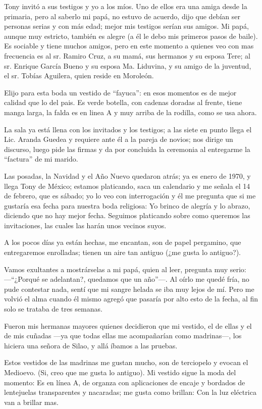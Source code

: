 \documentclass[letterpaper, 12pt]{book}
\begin{document}
Tony invitó a sus testigos y yo a los míos. Uno de ellos era una amiga desde la primaria, pero al saberlo mi papá, no estuvo de acuerdo, dijo que debían ser personas serias y con más edad; mejor mis testigos serían sus amigos. Mi papá, aunque muy estricto, también es alegre (a él le debo mis primeros pasos de baile). Es sociable y tiene muchos amigos, pero en este momento a quienes veo con mas frecuencia es al sr. Ramiro Cruz, a su mamá, sus hermanos y su esposa Tere; al sr. Enrique García Bueno y su esposa Ma. Liduvina, y su amigo de la juventud, el sr. Tobías Aguilera, quien reside en Moroleón.

Elijo para esta boda un vestido de ``fayuca'': en esos momentos es de mejor calidad que lo del pais. Es verde botella, con cadenas doradas al frente, tiene manga larga, la falda es en linea A y muy arriba de la rodilla, como se usa ahora.

La sala ya está llena con los invitados y los testigos; a las siete en punto llega el Lic. Aranda Guedea y requiere ante él a la pareja de novios; nos dirige un discurso, luego pide las firmas y da por concluida la ceremonia al entregarme la ``factura'' de mi marido.

Las posadas, la Navidad y el Año Nuevo quedaron atrás; ya es enero de 1970, y llega Tony de México; estamos platicando, saca un calendario y me señala el 14 de febrero, que es sábado; yo lo veo con interrogación y él me pregunta que si me gustaría esa fecha para nuestra boda religiosa: Yo brinco de alegría y lo abrazo, diciendo que no hay mejor fecha. Seguimos platicando sobre como queremos las invitaciones, las cuales las harán unos vecinos suyos.

A los pocos días ya están hechas, me encantan, son de papel pergamino, que entregaremos enrolladas; tienen un aire tan antiguo (¿me gusta lo antiguo?).

Vamos exultantes a mostrárselas a mi papá, quien al leer, pregunta muy serio: ---``¿Porqué se adelantan?, quedamos que un año''---. Al oírlo me quedé fría, no pude contestar nada, sentí que mi sangre helada se iba muy lejos de mí. Pero me volvió el alma cuando él mismo agregó que pasaría por alto esto de la fecha, al fin solo se trataba de tres semanas.

Fueron mis hermanas mayores quienes decidieron que mi vestido, el de ellas y el de mis cuñadas ---ya que todas ellas me acompañarían como madrinas---, los hiciera una señora de Silao, y allá íbamos a las pruebas.

Estos vestidos de las madrinas me gustan mucho, son de terciopelo y evocan el Medioevo. (Si, creo que me gusta lo antiguo).  
Mi vestido sigue la moda del momento: Es en línea A, de organza con aplicaciones de encaje y bordados de lentejuelas transparentes y nacaradas; me gusta como brillan: Con la luz eléctrica van a brillar mas.
\end{document}

